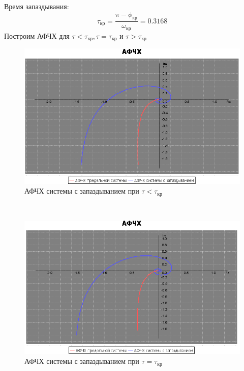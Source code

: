 \documentclass[12pt]{article}
\begin{document}
Время запаздывания: 
\begin{equation}
    \tau_{кр} = \frac{\pi - \phi_{кр}}{\omega_{кр}} = 0.3168
\end{equation}
Построим АФЧХ для $\tau < \tau_{кр}, \tau = \tau_{кр}$ и $\tau > \tau_{кр}$ \\
\begin{figure}[h!]
     \centering
    \includegraphics[width = \linewidth]{tau меньше tau крит.png}
    \caption{АФЧХ системы с запаздыванием при $\tau < \tau_{кр}$}
\end{figure} \\
\newpage
\begin{figure}[h!]
     \centering
    \includegraphics[width = \linewidth]{tau равно tau крит.png}
    \caption{АФЧХ системы с запаздыванием при $\tau = \tau_{кр}$}
\end{figure} 
\end{document}
